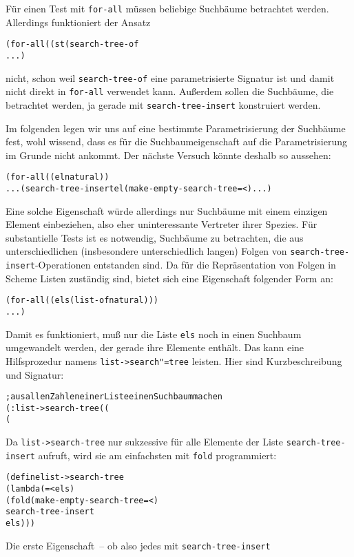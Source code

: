 Für einen Test mit \texttt{for-all} müssen beliebige Suchbäume
betrachtet werden.  Allerdings funktioniert der Ansatz
%
\begin{alltt}
(for-all ((st (search-tree-of %a)))
  ...)
\end{alltt}
%
nicht, schon weil \texttt{search-tree-of} eine  parametrisierte Signatur ist und
damit nicht direkt in \texttt{for-all} verwendet kann.  Außerdem
sollen die Suchbäume, die betrachtet werden, ja gerade mit
\texttt{search-tree-insert} konstruiert werden.  

Im folgenden legen wir uns auf eine bestimmte Parametrisierung der Suchbäume
fest, wohl wissend, dass es für die Suchbaumeigenschaft auf die
Parametrisierung im Grunde nicht ankommt. Der nächste Versuch
könnte deshalb so aussehen:
%
\begin{alltt}
(for-all ((el natural))
  ... (search-tree-insert el (make-empty-search-tree = <) ...)
\end{alltt}
%
Eine solche Eigenschaft würde allerdings nur Suchbäume mit einem
einzigen Element einbeziehen, also eher uninteressante Vertreter ihrer
Spezies.  Für substantielle Tests ist es notwendig, Suchbäume zu
betrachten, die aus unterschiedlichen (insbesondere unterschiedlich
langen) Folgen von \texttt{search-tree-insert}-Operationen entstanden
sind.  Da für die Repräsentation von Folgen in Scheme Listen zuständig
sind, bietet sich eine Eigenschaft folgender Form an:
%
\begin{alltt}
(for-all ((els (list-of natural)))
  ...)
\end{alltt}
%
Damit es funktioniert, muß nur die Liste \texttt{els} noch in einen
Suchbaum umgewandelt werden, der gerade ihre Elemente enthält.  Das
kann eine Hilfsprozedur namens \texttt{list->search"=tree} leisten.
Hier sind Kurzbeschreibung und Signatur:
%
\begin{alltt}
; aus allen Zahlen einer Liste einen Suchbaum machen
(: list->search-tree ((%a %a -> boolean)
                      (%a %a -> boolean) (list-of %a) -> (search-tree-of %a)))
\end{alltt}
%
Da \texttt{list->search-tree} nur sukzessive für alle Elemente der
Liste \texttt{search-tree-insert} aufruft, wird sie am einfachsten mit
\texttt{fold} programmiert:
%
\begin{alltt}
(define list->search-tree
  (lambda (= < els)
    (fold (make-empty-search-tree = <)
          search-tree-insert
          els)))
\end{alltt}
%
Die erste Eigenschaft~-- ob also jedes mit \texttt{search-tree-insert}
